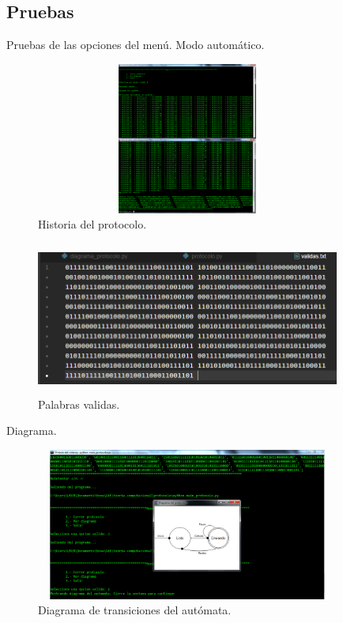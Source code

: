 	\subsection{Pruebas}
	Pruebas de las opciones del menú.
	{\large Modo automático.}
	\begin{figure}[H]
		\begin{center}
			\includegraphics[width=10cm, height=5cm]{img/protocolo-automata.png}
			\caption{Historia del protocolo. \cite{WEB}}
			\label{fig:protocolo1}
		\end{center}
	\end{figure}
	\begin{figure}[H]
		\begin{center}
			\includegraphics[width=10cm, height=5cm]{img/protocolo-salida.png}
			\caption{Palabras validas. \cite{WEB}}
			\label{fig:protocolo2}
		\end{center}
	\end{figure}
	{\large Diagrama.}
	\begin{figure}[H]
		\begin{center}
			\includegraphics[width=10cm, height=5cm]{img/protocolo-diagrama.png}
			\caption{Diagrama de transiciones del autómata.}
			\label{fig:protocolo3}
		\end{center}
	\end{figure}